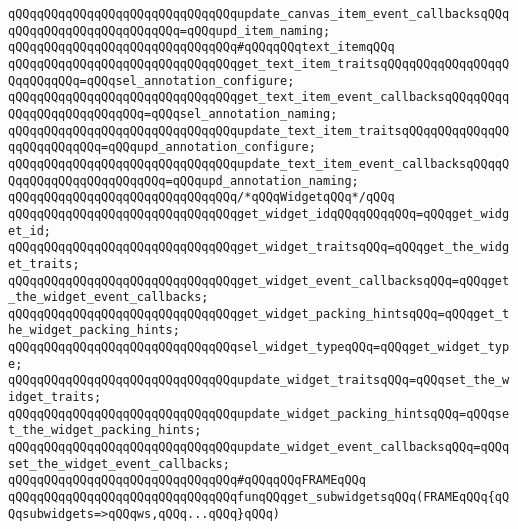 \verb|qQQqqQQqqQQqqQQqqQQqqQQqqQQqqQQqupdate_canvas_item_event_callbacksqQQqqQQqqQQqqQQqqQQqqQQqqQQq=qQQqupd_item_naming;|\newline
\newline
\verb|qQQqqQQqqQQqqQQqqQQqqQQqqQQqqQQq#qQQqqQQqtext_itemqQQq|\newline
\verb|qQQqqQQqqQQqqQQqqQQqqQQqqQQqqQQqget_text_item_traitsqQQqqQQqqQQqqQQqqQQqqQQqqQQq=qQQqsel_annotation_configure;|\newline
\verb|qQQqqQQqqQQqqQQqqQQqqQQqqQQqqQQqget_text_item_event_callbacksqQQqqQQqqQQqqQQqqQQqqQQqqQQq=qQQqsel_annotation_naming;|\newline
\verb|qQQqqQQqqQQqqQQqqQQqqQQqqQQqqQQqupdate_text_item_traitsqQQqqQQqqQQqqQQqqQQqqQQqqQQq=qQQqupd_annotation_configure;|\newline
\verb|qQQqqQQqqQQqqQQqqQQqqQQqqQQqqQQqupdate_text_item_event_callbacksqQQqqQQqqQQqqQQqqQQqqQQqqQQq=qQQqupd_annotation_naming;|\newline
\newline
\verb|qQQqqQQqqQQqqQQqqQQqqQQqqQQqqQQq/*qQQqWidgetqQQq*/qQQq|\newline
\verb|qQQqqQQqqQQqqQQqqQQqqQQqqQQqqQQqget_widget_idqQQqqQQqqQQq=qQQqget_widget_id;|\newline
\verb|qQQqqQQqqQQqqQQqqQQqqQQqqQQqqQQqget_widget_traitsqQQq=qQQqget_the_widget_traits;|\newline
\verb|qQQqqQQqqQQqqQQqqQQqqQQqqQQqqQQqget_widget_event_callbacksqQQq=qQQqget_the_widget_event_callbacks;|\newline
\verb|qQQqqQQqqQQqqQQqqQQqqQQqqQQqqQQqget_widget_packing_hintsqQQq=qQQqget_the_widget_packing_hints;|\newline
\verb|qQQqqQQqqQQqqQQqqQQqqQQqqQQqqQQqsel_widget_typeqQQq=qQQqget_widget_type;|\newline
\verb|qQQqqQQqqQQqqQQqqQQqqQQqqQQqqQQqupdate_widget_traitsqQQq=qQQqset_the_widget_traits;|\newline
\verb|qQQqqQQqqQQqqQQqqQQqqQQqqQQqqQQqupdate_widget_packing_hintsqQQq=qQQqset_the_widget_packing_hints;|\newline
\verb|qQQqqQQqqQQqqQQqqQQqqQQqqQQqqQQqupdate_widget_event_callbacksqQQq=qQQqset_the_widget_event_callbacks;|\newline
\newline
\verb|qQQqqQQqqQQqqQQqqQQqqQQqqQQqqQQq#qQQqqQQqFRAMEqQQq|\newline
\verb|qQQqqQQqqQQqqQQqqQQqqQQqqQQqqQQqfunqQQqget_subwidgetsqQQq(FRAMEqQQq{qQQqsubwidgets=>qQQqws,qQQq...qQQq}qQQq)|\newline
